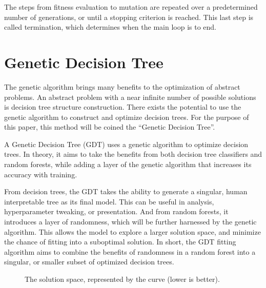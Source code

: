 \documentclass[12pt]{article}
\begin{document}
The steps from fitness evaluation to mutation are repeated over a predetermined number of generations, or until a stopping criterion is reached. This last step is called termination, which determines when the main loop is to end.

\section{Genetic Decision Tree}

The genetic algorithm brings many benefits to the optimization of abstract problems. An abstract problem with a near infinite number of possible solutions is decision tree structure construction. There exists the potential to use the genetic algorithm to construct and optimize decision trees. For the purpose of this paper, this method will be coined the ``Genetic Decision Tree''.

A Genetic Decision Tree (GDT) uses a genetic algorithm to optimize decision trees. In theory, it aims to take the benefits from both decision tree classifiers and random forests, while adding a layer of the genetic algorithm that increases its accuracy with training.

From decision trees, the GDT takes the ability to generate a singular, human interpretable tree as its final model. This can be useful in analysis, hyperparameter tweaking, or presentation. And from random forests, it introduces a layer of randomness, which will be further harnessed by the genetic algorithm. This allows the model to explore a larger solution space, and minimize the chance of fitting into a suboptimal solution. In short, the GDT fitting algorithm aims to combine the benefits of randomness in a random forest into a singular, or smaller subset of optimized decision trees.

\begin{figure}[H]
    \centering
    \caption{The solution space, represented by the curve (lower is better).}
    \label{fig:solutionspace}
\end{figure}
\end{document}
